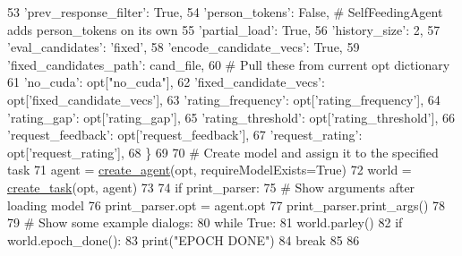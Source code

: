 \begin{DoxyCode}
53         \textcolor{stringliteral}{'prev\_response\_filter'}: \textcolor{keyword}{True},
54         \textcolor{stringliteral}{'person\_tokens'}: \textcolor{keyword}{False},  \textcolor{comment}{# SelfFeedingAgent adds person\_tokens on its own}
55         \textcolor{stringliteral}{'partial\_load'}: \textcolor{keyword}{True},
56         \textcolor{stringliteral}{'history\_size'}: 2,
57         \textcolor{stringliteral}{'eval\_candidates'}: \textcolor{stringliteral}{'fixed'},
58         \textcolor{stringliteral}{'encode\_candidate\_vecs'}: \textcolor{keyword}{True},
59         \textcolor{stringliteral}{'fixed\_candidates\_path'}: cand\_file,
60         \textcolor{comment}{# Pull these from current opt dictionary}
61         \textcolor{stringliteral}{'no\_cuda'}: opt[\textcolor{stringliteral}{"no\_cuda"}],
62         \textcolor{stringliteral}{'fixed\_candidate\_vecs'}: opt[\textcolor{stringliteral}{'fixed\_candidate\_vecs'}],
63         \textcolor{stringliteral}{'rating\_frequency'}: opt[\textcolor{stringliteral}{'rating\_frequency'}],
64         \textcolor{stringliteral}{'rating\_gap'}: opt[\textcolor{stringliteral}{'rating\_gap'}],
65         \textcolor{stringliteral}{'rating\_threshold'}: opt[\textcolor{stringliteral}{'rating\_threshold'}],
66         \textcolor{stringliteral}{'request\_feedback'}: opt[\textcolor{stringliteral}{'request\_feedback'}],
67         \textcolor{stringliteral}{'request\_rating'}: opt[\textcolor{stringliteral}{'request\_rating'}],
68     \}
69 
70     \textcolor{comment}{# Create model and assign it to the specified task}
71     agent = \hyperlink{namespaceparlai_1_1core_1_1agents_ad0d54074d4bcc148bb415ab5515a53b5}{create\_agent}(opt, requireModelExists=\textcolor{keyword}{True})
72     world = \hyperlink{namespaceparlai_1_1core_1_1worlds_a11923c10b545c7ecc1b08fe2242d9c2c}{create\_task}(opt, agent)
73 
74     \textcolor{keywordflow}{if} print\_parser:
75         \textcolor{comment}{# Show arguments after loading model}
76         print\_parser.opt = agent.opt
77         print\_parser.print\_args()
78 
79     \textcolor{comment}{# Show some example dialogs:}
80     \textcolor{keywordflow}{while} \textcolor{keyword}{True}:
81         world.parley()
82         \textcolor{keywordflow}{if} world.epoch\_done():
83             print(\textcolor{stringliteral}{"EPOCH DONE"})
84             \textcolor{keywordflow}{break}
85 
86 
\end{DoxyCode}
\mbox{\label{namespaceprojects_1_1self__feeding_1_1interactive_a2ad3b874d9caef6e76ea41e029b933f0}} 
